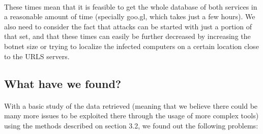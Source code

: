 \documentclass[12pt]{article}
\begin{document}
\paragraph{}
These times mean that it is feasible to get the whole database of both services in a reasonable amount of time (specially goo.gl, which takes just a few hours). We also need to consider the fact that attacks can be started with just a portion of that set, and that these times can easily be further decreased by increasing the botnet size or trying to localize the infected computers on a certain location close to the URLS servers.

\subsection{What have we found?}

\paragraph{}
With a basic study of the data retrieved (meaning that we believe there could be many more issues to be exploited there through the usage of more complex tools) using the methods described on section 3.2, we found out the following problems:
\end{document}
